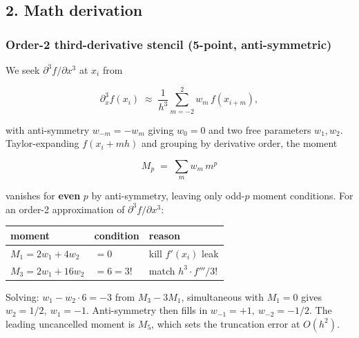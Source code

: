 \subsection{2. Math derivation}\label{math-derivation}

\subsubsection{Order-2 third-derivative stencil (5-point,
anti-symmetric)}\label{order-2-third-derivative-stencil-5-point-anti-symmetric}

We seek \(\partial^3 f / \partial x^3\) at \(x_i\) from

\[
\partial_x^3 f(x_i) \;\approx\; \frac{1}{h^3}\sum_{m=-2}^{2} w_m\,f(x_{i+m}),
\]

with anti-symmetry \(w_{-m} = -w_m\) giving \(w_0 = 0\) and two free
parameters \(w_1, w_2\). Taylor-expanding \(f(x_i + m h)\) and grouping
by derivative order, the moment

\[
M_p \;=\; \sum_m w_m\,m^p
\]

vanishes for \textbf{even} \(p\) by anti-symmetry, leaving only
odd-\(p\) moment conditions. For an order-2 approximation of
\(\partial^3 f/\partial x^3\):

{\def\LTcaptype{none} %
\begin{longtable}[]{@{}
  >{\raggedright\arraybackslash}p{}
  >{\raggedright\arraybackslash}p{}
  >{\raggedright\arraybackslash}p{}@{}}
\toprule\noalign{}
\begin{minipage}[b]{\linewidth}\raggedright
moment
\end{minipage} & \begin{minipage}[b]{\linewidth}\raggedright
condition
\end{minipage} & \begin{minipage}[b]{\linewidth}\raggedright
reason
\end{minipage} \\
\midrule\noalign{}
\endhead
\bottomrule\noalign{}
\endlastfoot
\(M_1 = 2 w_1 + 4 w_2\) & \(= 0\) & kill \(f'(x_i)\) leak \\
\(M_3 = 2 w_1 + 16 w_2\) & \(= 6 = 3!\) & match \(h^3 \cdot f'''/3!\) \\
\end{longtable}
}

Solving: \(w_1 - w_2 \cdot 6 = -3\) from \(M_3 - 3 M_1\), simultaneous
with \(M_1 = 0\) gives \(w_2 = 1/2,\ w_1 = -1\). Anti-symmetry then
fills in \(w_{-1} = +1,\ w_{-2} = -1/2\). The leading uncancelled moment
is \(M_5\), which sets the truncation error at \(O(h^2)\).

